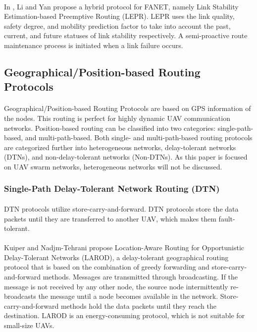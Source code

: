 \documentclass[a4paper,12pt]{report}
\begin{document}
\paragraph{}
In \cite{li2017lepr}, Li and Yan propose a hybrid protocol for FANET, namely Link Stability Estimation-based Preemptive Routing (LEPR). LEPR uses the link quality, safety degree, and mobility prediction factor to take into account the past, current, and future statuses of link stability respectively. A semi-proactive route maintenance process is initiated when a link failure occurs.

\subsection{Geographical/Position-based Routing Protocols}
\paragraph{}
Geographical/Position-based Routing Protocols are based on GPS information of the nodes. This routing is perfect for highly dynamic UAV communication networks. Position-based routing can be classified into two categories: single-path-based, and multi-path-based. Both single- and multi-path-based routing protocols are categorized further into heterogeneous networks, delay-tolerant networks (DTNs), and non-delay-tolerant networks (Non-DTNs)\cite{8772093}. As this paper is focused on UAV swarm networks, heterogeneous networks will not be discussed. 

\subsubsection{Single-Path Delay-Tolerant Network Routing (DTN)}
\paragraph{}
DTN protocols utilize store-carry-and-forward. DTN protocols store the data packets until they are transferred to another UAV, which makes them fault-tolerant.

\paragraph{}
Kuiper and Nadjm-Tehrani\cite{5634136} propose Location-Aware Routing for Opportunistic Delay-Tolerant Networks (LAROD), a delay-tolerant geographical routing protocol that is based on the combination of greedy forwarding and store-carry-and-forward methods. Messages are transmitted through broadcasting. If the message is not received by any other node, the source node intermittently re-broadcasts the message until a node becomes available in the network. Store-carry-and-forward methods hold the data packets until they reach the destination. LAROD is an energy-consuming protocol, which is not suitable for small-size UAVs.
\end{document}
